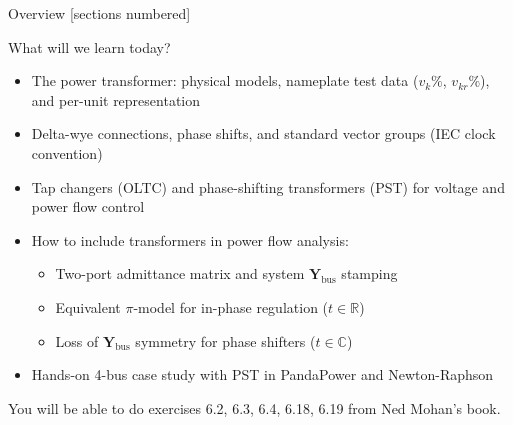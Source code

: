 \titleframe

\begin{frame}[allowframebreaks]{Overview}
  [sections numbered]
  \tableofcontents%
\end{frame}


\begin{frame}{What will we learn today?}
    \begin{itemize}
        \item The power transformer: physical models, nameplate test data ($v_k\%$, $v_{kr}\%$), and per-unit representation
        \item Delta-wye connections, phase shifts, and standard vector groups (IEC clock convention)
        \item Tap changers (OLTC) and phase-shifting transformers (PST) for voltage and power flow control
        \item How to include transformers in power flow analysis:
        \begin{itemize}
            \item Two-port admittance matrix and system $\mathbf{Y}_{\text{bus}}$ stamping
            \item Equivalent $\pi$-model for in-phase regulation ($t \in \mathbb{R}$)
            \item Loss of $\mathbf{Y}_{\text{bus}}$ symmetry for phase shifters ($t \in \mathbb{C}$)
        \end{itemize}
        \item Hands-on 4-bus case study with PST in PandaPower and Newton-Raphson
    \end{itemize}
    You will be able to do exercises 6.2, 6.3, 6.4, 6.18, 6.19 from Ned Mohan's book.
\end{frame}



